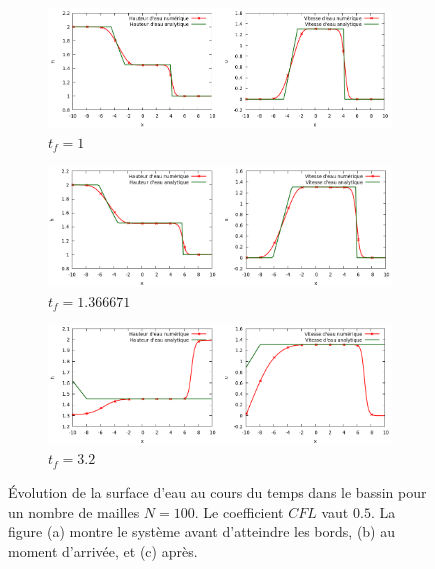\documentclass[
	french,
	11pt, %
]{fphw}
\begin{document}
\begin{figure}[H]
	\centering
	\begin{subfigure}[b]{0.9\textwidth}
		\centering
		\includegraphics[width=\textwidth]{PiscineBornee1.png}
		\caption{$t_{f}=1$}
		\label{fig:Piscine1A}
	\end{subfigure}
	\begin{subfigure}[b]{0.9\textwidth}
		\centering
		\includegraphics[width=\textwidth]{PiscineBornee2.png}
		\caption{$t_{f}=1.366671$}
		\label{fig:Piscine1B}
	\end{subfigure}
	\begin{subfigure}[b]{0.9\textwidth}
		\centering
		\includegraphics[width=\textwidth]{PiscineBornee3.png}
		\caption{$t_{f}=3.2$}
		\label{fig:Piscine1C}
	\end{subfigure}
	\caption{Évolution de la surface d'eau au cours du temps dans le bassin pour un nombre de mailles $N=100$. Le coefficient $CFL$ vaut $0.5$. La figure (a) montre le système avant d'atteindre les bords, (b) au moment d'arrivée, et (c) après.}
	\label{fig:Piscine1}
\end{figure}
\end{document}
